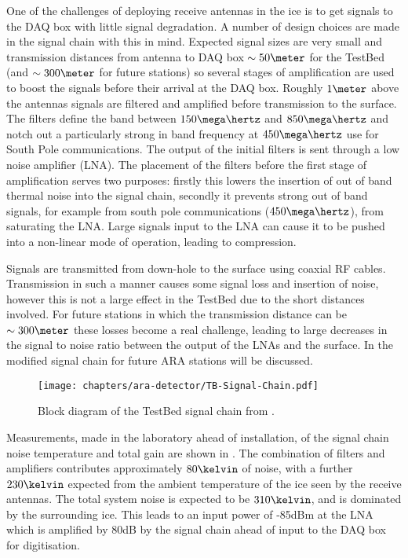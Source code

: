 One of the challenges of deploying receive antennas in the ice is to get signals to the DAQ box with little signal degradation. A number of design choices are made in the signal chain with this in mind. Expected signal sizes are very small and transmission distances from antenna to DAQ box $\sim 50\meter$ for the TestBed (and $\sim 300\meter$ for future stations) so several stages of amplification are used to boost the signals before their arrival at the DAQ box. Roughly $1 \meter$ above the antennas signals are filtered and amplified before transmission to the surface. The filters define the band between $150 \mega\hertz$ and $850 \mega\hertz$ and notch out a particularly strong in band frequency at $450 \mega \hertz$ use for South Pole communications. The output of the initial filters is sent through a low noise amplifier (LNA). The placement of the filters before the first stage of amplification serves two purposes: firstly this lowers the insertion of out of band thermal noise into the signal chain, secondly it prevents strong out of band signals, for example from south pole communications ($450 \mega\hertz$), from saturating the LNA. Large signals input to the LNA can cause it to be pushed into a non-linear mode of operation, leading to compression.

Signals are transmitted from down-hole to the surface using coaxial RF cables. Transmission in such a manner causes some signal loss and insertion of noise, however this is not a large effect in the TestBed due to the short distances involved. For future stations in which the transmission distance can be $\sim 300 \meter$ these losses become a real challenge, leading to large decreases in the signal to noise ratio between the output of the LNAs and the surface. In  the modified signal chain for future ARA stations will be discussed.

\begin{figure}[htpb]
  \centering
  \texttt{[image: chapters/ara-detector/TB-Signal-Chain.pdf]}
  \caption{Block diagram of the TestBed signal chain from \cite{Allison2012457}.}
  \label{fig:ara-detector:TestBed:Signal-Chain}
\end{figure}

Measurements, made in the laboratory ahead of installation, of the signal chain noise temperature and total gain are shown in . The combination of filters and amplifiers contributes approximately $80 \kelvin$ of noise, with a further $230 \kelvin$ expected from the ambient temperature of the ice seen by the receive antennas. The total system noise is expected to be $310 \kelvin$, and is dominated by the surrounding ice. This leads to an input power of -85dBm at the LNA which is amplified by 80dB by the signal chain ahead of input to the DAQ box for digitisation.

